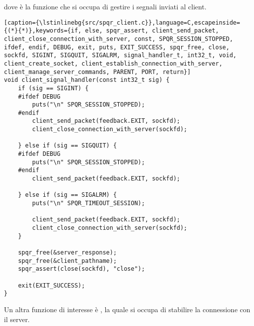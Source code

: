 dove  è la funzione che si occupa di gestire i segnali inviati al client.

\begin{lstlisting}[caption={\lstinlinebg{src/spqr_client.c}},language=C,escapeinside={(*}{*)},keywords={if, else, spqr_assert, client_send_packet, client_close_connection_with_server, const, SPQR_SESSION_STOPPED, ifdef, endif, DEBUG, exit, puts, EXIT_SUCCESS, spqr_free, close, sockfd, SIGINT, SIGQUIT, SIGALRM, signal_handler_t, int32_t, void, client_create_socket, client_establish_connection_with_server, client_manage_server_commands, PARENT, PORT, return}]
void client_signal_handler(const int32_t sig) {
    if (sig == SIGINT) {
    #ifdef DEBUG
        puts("\n" SPQR_SESSION_STOPPED);
    #endif
        client_send_packet(feedback.EXIT, sockfd);
        client_close_connection_with_server(sockfd);

    } else if (sig == SIGQUIT) {
    #ifdef DEBUG
        puts("\n" SPQR_SESSION_STOPPED);
    #endif
        client_send_packet(feedback.EXIT, sockfd);

    } else if (sig == SIGALRM) {
        puts("\n" SPQR_TIMEOUT_SESSION);

        client_send_packet(feedback.EXIT, sockfd);
        client_close_connection_with_server(sockfd);
    }

    spqr_free(&server_response);
    spqr_free(&client_pathname);
    spqr_assert(close(sockfd), "close");

    exit(EXIT_SUCCESS);
}
\end{lstlisting}

Un altra funzione di interesse è , la quale si occupa di stabilire la connessione con il server.

